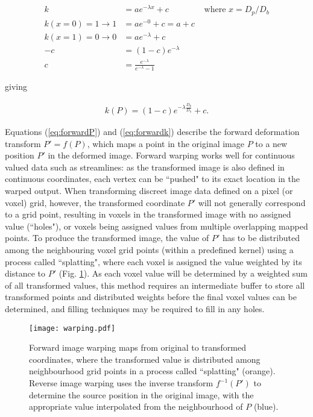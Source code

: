 \begin{align}
  k &= a e^{-\lambda x} + c &\text{ where } x = D_p / D_b \nonumber \\
  k(x=0)=1 \longrightarrow 1 &= a e^{-0} + c = a + c \nonumber \\
  k(x=1)=0 \longrightarrow 0 &= a e^{-\lambda} + c \nonumber \\
  -c &= (1-c) e^{-\lambda} \nonumber \\
  c &= \frac{e^{-\lambda}}{e^{-\lambda} - 1} \label{eq:c}
\end{align}

giving

\begin{align}\label{eq:forwardk}
  k(P) = (1-c)e^{-\lambda \frac{D_p}{D_b}} +c.
\end{align}

Equations (\ref{eq:forwardP}) and (\ref{eq:forwardk}) describe the forward deformation transform $P'=f(P)$, which maps a point in the original image $P$ to a new position $P'$ in the deformed image.
Forward warping works well for continuous valued data such as streamlines: as the transformed image is also defined in continuous coordinates, each vertex can be ``pushed" to its exact location in the warped output.
When transforming discreet image data defined on a pixel (or voxel) grid, however, the transformed coordinate $P'$ will not generally correspond to a grid point, resulting in voxels in the transformed image with no assigned value (``holes"), or voxels being assigned values from multiple overlapping mapped points.
To produce the transformed image, the value of $P'$ has to be distributed among the neighbouring voxel grid points (within a predefined kernel) using a process called ``splatting",\autocite{Niklaus2020} where each voxel is assigned the value weighted by its distance to $P'$ (Fig. \ref{fig:warp}).
As each voxel value will be determined by a weighted sum of all transformed values, this method requires an intermediate buffer to store all transformed points and distributed weights before the final voxel values can be determined, and filling techniques may be required to fill in any holes.

\begin{figure}[h!]
  \centering
  \texttt{[image: warping.pdf]}
  \caption{Forward image warping maps from original to transformed coordinates, where the transformed value is distributed among neighbourhood grid points in a process called ``splatting" (orange). Reverse image warping uses the inverse transform $f^{-1}(P')$ to determine the source position in the original image, with the appropriate value interpolated from the neighbourhood of $P$ (blue).}
  \label{fig:warp}
\end{figure}

